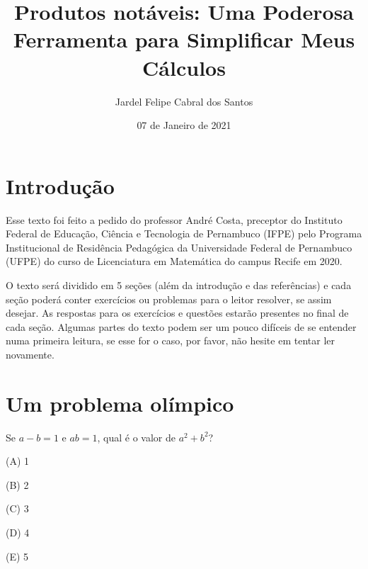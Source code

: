 \documentclass[a4paper, 12pt]{article}
\title{Produtos notáveis: Uma Poderosa Ferramenta para Simplificar Meus Cálculos}
\author{Jardel Felipe Cabral dos Santos }
\date{07 de Janeiro de 2021}
\begin{document}
\maketitle



%
\thispagestyle{fancy} 
\section{Introdução}


Esse texto foi feito a pedido do professor André Costa, preceptor do Instituto Federal de Educação, Ciência e Tecnologia de Pernambuco (IFPE) pelo Programa Institucional de Residência Pedagógica da Universidade Federal de Pernambuco (UFPE) do curso de Licenciatura em Matemática do campus Recife em 2020. 

\noindent O texto será dividido em 5 seções (além da introdução e das referências) e cada seção poderá conter exercícios ou problemas para o leitor resolver, se assim desejar. %
 As respostas para os exercícios e questões estarão presentes no final de cada seção. Algumas partes do texto podem ser um pouco difíceis de se entender numa primeira leitura, se esse for o caso, por favor, não hesite em tentar ler novamente.


%

\section{Um problema olímpico}


    


\begin{flushleft}
Se \(a - b = 1\) e \(ab = 1\), qual é o valor de \(a^2 + b^2\)?  %

(A) 1

(B) 2

(C) 3

(D) 4   

(E) 5

\end{flushleft}    
    
\end{document}
